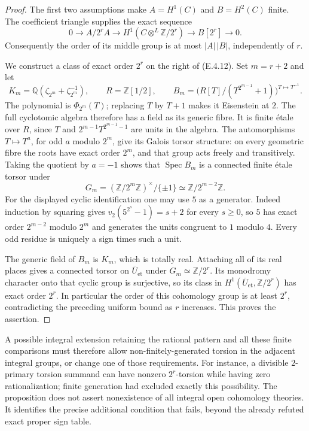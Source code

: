 \begin{proof}
The first two assumptions make $A=H^1(C)$ and $B=H^2(C)$ finite.
The coefficient triangle supplies the exact sequence
\[
 0\longrightarrow A/2^rA
   \longrightarrow H^1(C\otimes^L\mathbb Z/2^r)
   \longrightarrow B[2^r]\longrightarrow0.
\]
Consequently the order of its middle group is at most $|A|\,|B|$,
independently of $r$.

We construct a class of exact order $2^r$ on the right of (E.4.12).
Set $m=r+2$ and let
\[
 K_m=\mathbb Q(\zeta_{2^m}+\zeta_{2^m}^{-1}),\qquad
 R=\mathbb Z[1/2],\qquad
 B_m=\bigl(R[T]/(T^{2^{m-1}}+1)\bigr)^{T\mapsto T^{-1}}.
\]
The polynomial is $\Phi_{2^m}(T)$; replacing $T$ by $T+1$ makes
it Eisenstein at $2$. The full cyclotomic algebra therefore has a
field as its generic fibre. It is finite \'etale over $R$, since
$T$ and $2^{m-1}T^{2^{m-1}-1}$ are units in the algebra.
The automorphisms $T\mapsto T^a$, for odd $a$ modulo $2^m$, give
its Galois torsor structure: on every geometric fibre the roots have
exact order $2^m$, and that group acts freely and transitively.
Taking the quotient by $a=-1$ shows that $\operatorname{Spec}B_m$
is a connected finite \'etale torsor under
\[
 G_m=(\mathbb Z/2^m\mathbb Z)^\times/\{\pm1\}
       \simeq\mathbb Z/2^{m-2}\mathbb Z.
\]
For the displayed cyclic identification one may use $5$ as a generator.
Indeed induction by squaring gives
$v_2(5^{2^s}-1)=s+2$ for every $s\geq0$, so $5$ has exact order
$2^{m-2}$ modulo $2^m$ and generates the units congruent to $1$
modulo $4$. Every odd residue is uniquely a sign times such a unit.

The generic field of $B_m$ is $K_m$, which is totally real.
Attaching all of its real places gives a connected torsor on
$\overline U_{\mathrm{et}}$ under $G_m\simeq\mathbb Z/2^r$.
Its monodromy character onto that cyclic group is surjective,
so its class in $H^1(\overline U_{\mathrm{et}},\mathbb Z/2^r)$
has exact order $2^r$. In particular the order of this cohomology
group is at least $2^r$, contradicting the preceding uniform bound
as $r$ increases. This proves the assertion.
\end{proof}

A possible integral extension retaining the rational pattern and all
these finite comparisons must therefore allow non-finitely-generated
torsion in the adjacent integral groups, or change one of those
requirements. For instance, a divisible $2$-primary torsion summand
can have nonzero $2^r$-torsion while having zero rationalization;
finite generation had excluded exactly this possibility.
The proposition does not assert nonexistence of all integral open
cohomology theories. It identifies the precise additional condition
that fails, beyond the already refuted exact proper sign table.
